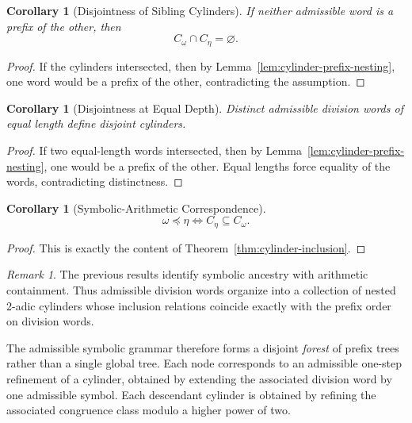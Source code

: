 \documentclass[12pt, oneside]{article}
\numberwithin{equation}{section}
\theoremstyle{definition}
\theoremstyle{plain}
\newtheorem{corollary}[theorem]{Corollary}
\theoremstyle{remark}
\newtheorem*{remark}{Remark}
\begin{document}
\begin{corollary}[Disjointness of Sibling Cylinders]
\label{cor:sibling-disjointness}
If neither admissible word is a prefix of the other, then
\[
C_\omega\cap C_\eta=\varnothing.
\]
\end{corollary}

\begin{proof}
If the cylinders intersected, then by
Lemma~\ref{lem:cylinder-prefix-nesting},
one word would be a prefix of the other, contradicting the assumption.
\end{proof}

\begin{corollary}[Disjointness at Equal Depth]
\label{cor:equal-depth-disjoint}
Distinct admissible division words of equal length define disjoint
cylinders.
\end{corollary}

\begin{proof}
If two equal-length words intersected, then by
Lemma~\ref{lem:cylinder-prefix-nesting},
one would be a prefix of the other.
Equal lengths force equality of the words, contradicting distinctness.
\end{proof}

\begin{corollary}[Symbolic-Arithmetic Correspondence]
\[
\omega\preceq\eta
\iff
C_\eta\subseteq C_\omega.
\]
\end{corollary}

\begin{proof}
This is exactly the content of
Theorem~\ref{thm:cylinder-inclusion}.
\end{proof}

\begin{remark}
The previous results identify symbolic ancestry with arithmetic
containment.  Thus admissible division words organize into a collection
of nested 2-adic cylinders whose inclusion relations coincide exactly
with the prefix order on division words.

The admissible symbolic grammar therefore forms a disjoint \emph{forest}
of prefix trees rather than a single global tree. Each node corresponds
to an admissible one-step refinement of a cylinder, obtained by
extending the associated division word by one admissible symbol.  Each
descendant cylinder is obtained by refining the associated congruence
class modulo a higher power of two.
\end{remark}

\end{document}
